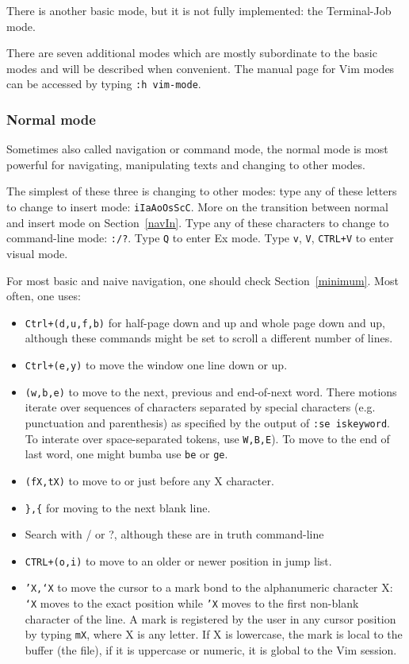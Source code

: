 \documentclass{article}
\begin{document}
There is another basic mode, but it is not fully implemented:
the Terminal-Job mode.

There are seven additional modes which are mostly subordinate 
to the basic modes and will be described when convenient.
The manual page for Vim modes can be accessed by typing
\texttt{:h vim-mode}.

\subsubsection{Normal mode}
Sometimes also called navigation or command mode,
the normal mode is most powerful for
navigating, manipulating texts and changing to other modes.

The simplest of these three is changing to other modes:
type any of these letters to change to insert mode:
\texttt{iIaAoOsScC}. More on the transition between
normal and insert mode on Section~\ref{navIn}.
Type any of these characters to change to command-line mode:
\texttt{:/?}.
Type \texttt{Q} to enter Ex mode.
Type \texttt{v}, \texttt{V}, \texttt{CTRL+V} to enter visual mode.

For most basic and naive navigation, one should check Section~\ref{minimum}.
Most often, one uses:
\begin{itemize}
  \item \texttt{Ctrl+(d,u,f,b)} for half-page down and up
and whole page down and up, although these commands might
be set to scroll a different number of lines.
  \item \texttt{Ctrl+(e,y)} to move the window one line down or up.
  \item \texttt{(w,b,e)} to move to the next, previous and end-of-next word. There motions iterate over sequences of characters separated
    by special characters (e.g. punctuation and parenthesis) as
    specified by the output of \texttt{:se iskeyword}.
    To interate over space-separated tokens, use \texttt{W,B,E}).
    To move to the end of last word, one might bumba use \texttt{be}
    or \texttt{ge}.
  \item \texttt{(fX,tX)} to move to or just before any X character.
  \item \texttt{\},\{} for moving to the next blank line.
  \item Search with / or ?, although these are in truth command-line 
  \item \texttt{CTRL+(o,i)} to move to an older or newer position in
    jump list.
  \item \texttt{'X,`X} to move the cursor to a mark bond to the alphanumeric character X: \texttt{`X} moves to the exact position while \texttt{'X} moves to
    the first non-blank character of the line.
    A mark is registered by the user in any cursor position
    by typing \texttt{mX}, where X is any letter.
    If X is lowercase, the mark is local to the buffer (the file),
    if it is uppercase or numeric, it is global to the Vim session.
\end{itemize}
\end{document}
